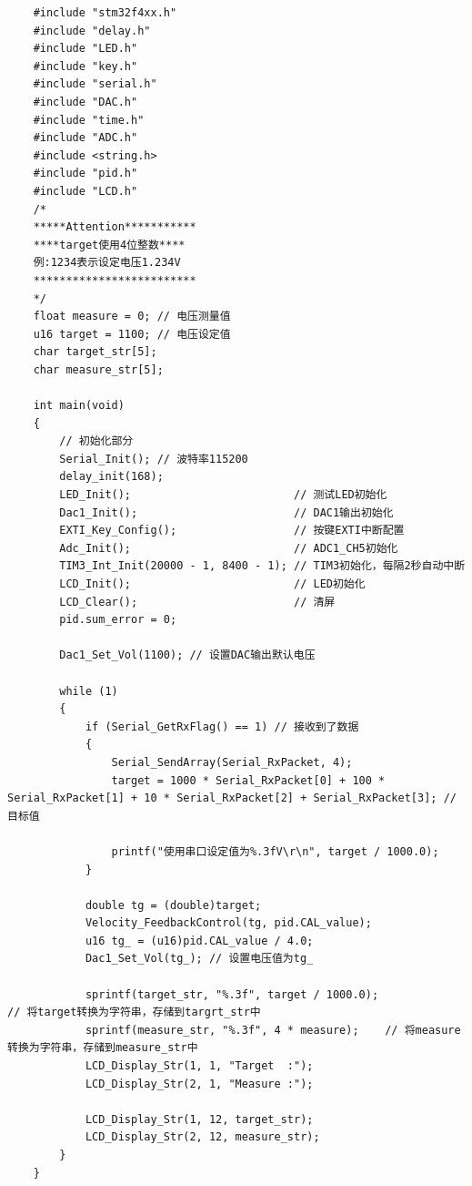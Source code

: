 \documentclass[a4paper]{article}
\theoremstyle{definition}
\theoremstyle{plain}
\theoremstyle{remark}
\begin{document}
\begin{verbatim}
	#include "stm32f4xx.h"
	#include "delay.h"
	#include "LED.h"
	#include "key.h"
	#include "serial.h"
	#include "DAC.h"
	#include "time.h"
	#include "ADC.h"
	#include <string.h>
	#include "pid.h"
	#include "LCD.h"
	/*
	*****Attention***********
	****target使用4位整数****
	例:1234表示设定电压1.234V
	*************************
	*/
	float measure = 0; // 电压测量值
	u16 target = 1100; // 电压设定值
	char target_str[5];
	char measure_str[5];
	
	int main(void)
	{
		// 初始化部分
		Serial_Init(); // 波特率115200
		delay_init(168);
		LED_Init();							// 测试LED初始化
		Dac1_Init();						// DAC1输出初始化
		EXTI_Key_Config();					// 按键EXTI中断配置
		Adc_Init();							// ADC1_CH5初始化
		TIM3_Int_Init(20000 - 1, 8400 - 1); // TIM3初始化，每隔2秒自动中断
		LCD_Init();							// LED初始化
		LCD_Clear();						// 清屏
		pid.sum_error = 0;
		
		Dac1_Set_Vol(1100); // 设置DAC输出默认电压
		
		while (1)
		{
			if (Serial_GetRxFlag() == 1) // 接收到了数据
			{
				Serial_SendArray(Serial_RxPacket, 4);
				target = 1000 * Serial_RxPacket[0] + 100 * Serial_RxPacket[1] + 10 * Serial_RxPacket[2] + Serial_RxPacket[3]; // 目标值
				
				printf("使用串口设定值为%.3fV\r\n", target / 1000.0);
			}
			
			double tg = (double)target;
			Velocity_FeedbackControl(tg, pid.CAL_value);
			u16 tg_ = (u16)pid.CAL_value / 4.0;
			Dac1_Set_Vol(tg_); // 设置电压值为tg_
			
			sprintf(target_str, "%.3f", target / 1000.0);		                            	// 将target转换为字符串，存储到targrt_str中
			sprintf(measure_str, "%.3f", 4 * measure);	  // 将measure转换为字符串，存储到measure_str中
			LCD_Display_Str(1, 1, "Target  :");
			LCD_Display_Str(2, 1, "Measure :");
			
			LCD_Display_Str(1, 12, target_str);
			LCD_Display_Str(2, 12, measure_str);
		}
	}
\end{verbatim}
\end{document}
